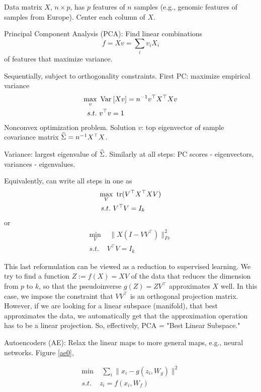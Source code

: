 \documentclass[english]{article}
\begin{document}
Data matrix $X$, $n \times p$, has $p$ features of $n$ samples (e.g., genomic features of samples from Europe). Center each column of $X$.

Principal Component Analysis (PCA): Find linear combinations 
$$f = Xv = \sum_i v_i X_i$$ 
of features that maximize variance. 


Sequentially, subject to orthogonality constraints. First PC: maximize empirical variance 
\begin{align*}
\max_v\,\,  &\operatorname{Var}_{}\left[Xv\right] = n^{-1} v^\top X^\top Xv\\
s.t.\,\,&v^\top v=1
\end{align*}
Nonconvex optimization problem. Solution $v$: top eigenvector of sample covariance matrix $\widehat{\Sigma} = n^{-1} X^\top X$.

Variance: largest eigenvalue of $\widehat{\Sigma}$. 
Similarly at all steps: PC scores - eigenvectors, variances - eigenvalues. 

Equivalently, can write all steps in one as 
\begin{align*}
\max_V&\,\, \operatorname{tr} (V^\top X^\top XV)\\
s.t.\,\,&V^\top V=I_k
\end{align*}
or 
\begin{align*}
\min_V&\,\,\|X(I-VV^\top)\|_{Fr}^2\\
s.t.\,\,&V^\top V=I_k
\end{align*}

This last reformulation can be viewed as a reduction to supervised learning. We try to find a function $Z:=f(X)=XV$ of the data that reduces the dimension from $p$ to $k$, so that the pseudoinverse $g(Z) = ZV^\top$ approximates $X$ well. In this case, we impose the constraint that $VV^\top$ is an orthogonal projection matrix. However, if we are looking for a linear subspace (manifold), that best approximates the data, we automatically get that the approximation operation has to be a linear projection. So, effectively, PCA = "Best Linear Subspace."


\item Autoencoders (AE): Relax the linear maps to more general maps, e.g., neural networks.  Figure \ref{ae0},

\begin{align*}
\min&\,\,\sum_i \|x_i-g(z_i,W_g)\|^2\\
s.t.\,\,&z_i = f(x_i,W_f)
\end{align*}
\end{document}
